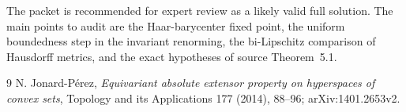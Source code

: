 \documentclass[11pt]{article}
\begin{document}
The packet is recommended for expert review as a likely valid full solution.
The main points to audit are the Haar-barycenter fixed point, the uniform
boundedness step in the invariant renorming, the bi-Lipschitz comparison of
Hausdorff metrics, and the exact hypotheses of source Theorem~5.1.

\begin{thebibliography}{9}
N. Jonard-P\'erez,
\emph{Equivariant absolute extensor property on hyperspaces of convex sets},
Topology and its Applications 177 (2014), 88--96;
arXiv:1401.2653v2.
\end{thebibliography}
\end{document}

